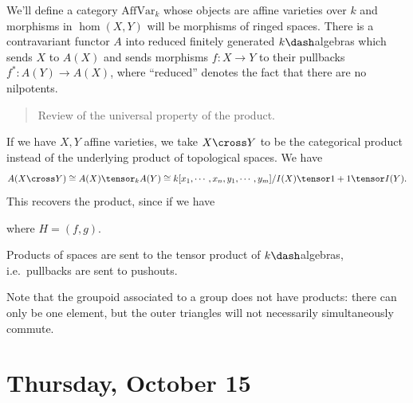 We'll define a category \(\mathrm{AffVar}_k\) whose objects are affine
varieties over \(k\) and morphisms in \(\hom(X, Y)\) will be morphisms
of ringed spaces. There is a contravariant functor \(A\) into reduced
finitely generated \(k\dash\)algebras which sends \(X\) to \(A(X)\) and
sends morphisms \(f:X\to Y\) to their pullbacks \(f^*:A(Y) \to A(X)\),
where ``reduced'' denotes the fact that there are no nilpotents.

\begin{quote}
Review of the universal property of the product.
\end{quote}

\begin{remark}

If we have \(X,Y\) affine varieties, we take \(X\cross Y\) to be the
categorical product instead of the underlying product of topological
spaces. We have
\begin{align*}
A(X\cross Y) \cong A(X) \tensor_k A(Y) \cong k[x_1, \cdots, x_n, y_1, \cdots, y_m] / I(X) \tensor 1 + 1 \tensor I(Y).\end{align*}
This recovers the product, since if we have

\begin{center}\end{center}

where \(H = (f, g)\).

\end{remark}

\begin{remark}

Products of spaces are sent to the tensor product of \(k\dash\)algebras,
i.e.~pullbacks are sent to pushouts.

\end{remark}

\begin{remark}

Note that the groupoid associated to a group does not have products:
there can only be one element, but the outer triangles will not
necessarily simultaneously commute.

\end{remark}

\hypertarget{thursday-october-15}{%
\section{Thursday, October 15}\label{thursday-october-15}}


